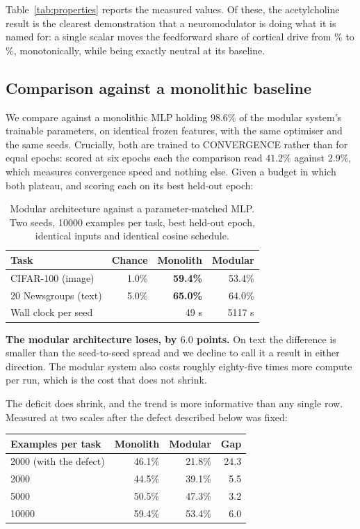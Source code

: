 \documentclass[conference]{IEEEtran}
\begin{document}
Table~\ref{tab:properties} reports the measured values. Of these, the
acetylcholine result is the clearest demonstration that a neuromodulator is
doing what it is named for: a single scalar moves the feedforward share of
cortical drive from \GatesAchLow{}\% to \GatesAchHigh{}\%, monotonically, while
being exactly neutral at its baseline.

\subsection{Comparison against a monolithic baseline}

We compare against a monolithic MLP holding $98.6\%$ of the modular system's
trainable parameters, on identical frozen features, with the same optimiser and
the same seeds. Crucially, both are trained to CONVERGENCE rather than for equal
epochs: scored at six epochs each the comparison read $41.2\%$ against $2.9\%$,
which measures convergence speed and nothing else. Given a budget in which both
plateau, and scoring each on its best held-out epoch:

\begin{table}[h]
\caption{Modular architecture against a parameter-matched MLP.
Two seeds, 10000 examples per task, best held-out epoch, identical inputs and identical cosine schedule.}
\label{tab:benchmark}
\centering
\begin{tabular}{lrrr}
\toprule
Task & Chance & Monolith & Modular \\
\midrule
CIFAR-100 (image) & 1.0\% & \textbf{59.4\%} & 53.4\% \\
20 Newsgroups (text) & 5.0\% & \textbf{65.0\%} & 64.0\% \\
\midrule
Wall clock per seed & & 49 s & 5117 s \\
\bottomrule
\end{tabular}
\end{table}

\textbf{The modular architecture loses, by $6.0$ points.} On text the
difference is smaller than the seed-to-seed spread and we decline to call it a
result in either direction. The modular system also costs roughly eighty-five
times more compute per run, which is the cost that does not shrink.

The deficit does shrink, and the trend is more informative than any single
row. Measured at two scales after the defect described below was fixed:

\begin{center}
\begin{tabular}{lrrr}
\toprule
Examples per task & Monolith & Modular & Gap \\
\midrule
2000 (with the defect) & 46.1\% & 21.8\% & 24.3 \\
2000 & 44.5\% & 39.1\% & 5.5 \\
5000 & 50.5\% & 47.3\% & 3.2 \\
10000 & 59.4\% & 53.4\% & 6.0 \\
\bottomrule
\end{tabular}
\end{center}
\end{document}
